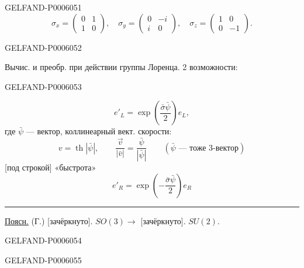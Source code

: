\begin{GelfandAdjacentEvidence}{GELFAND-P000605}{1}
\[
\sigma_x=\begin{pmatrix}0&1\\1&0\end{pmatrix},\quad
\sigma_y=\begin{pmatrix}0&-i\\i&0\end{pmatrix},\quad
\sigma_z=\begin{pmatrix}1&0\\0&-1\end{pmatrix}.
\]
\end{GelfandAdjacentEvidence}
\begin{GelfandAdjacentEvidence}{GELFAND-P000605}{2}

Вычис. и преобр. при действии группы Лоренца. 2 возможности:
\end{GelfandAdjacentEvidence}
\begin{GelfandAdjacentEvidence}{GELFAND-P000605}{3}

\[
e'_L=\exp\left(\frac{\bar\sigma\bar\psi}{2}\right)e_L,
\]
где \(\bar\psi\) — вектор, коллинеарный вект. скорости:
\[
v=\operatorname{th}|\bar\psi|,\qquad
\frac{\vec v}{|\bar v|}=\frac{\bar\psi}{|\bar\psi|}
\qquad(\bar\psi\text{ — тоже 3-вектор})
\]
[под строкой] «быстрота»
\[
e'_R=\exp\left(-\frac{\bar\sigma\bar\psi}{2}\right)e_R
\]
\rule{.21\linewidth}{.4pt}\par
\underline{Поясн.} (Г.) [зачёркнуто]. \(SO(3)\longrightarrow\)
[зачёркнуто]. \(SU(2)\).
\end{GelfandAdjacentEvidence}
\begin{GelfandAdjacentEvidence}{GELFAND-P000605}{4}

\end{GelfandAdjacentEvidence}
\begin{GelfandAdjacentEvidence}{GELFAND-P000605}{5}

\end{GelfandAdjacentEvidence}
